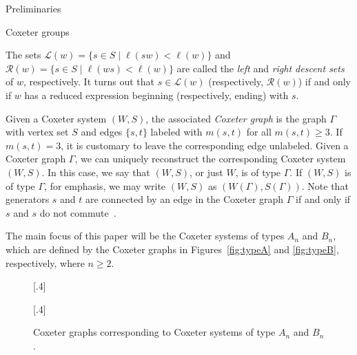 \documentclass[11pt]{amsart}
\theoremstyle{definition}
\numberwithin{equation}{section}
\newcommand{\x}{\mathsf{x}}
\renewcommand{\L}{\mathcal{L}}
\newcommand{\R}{\mathcal{R}}
\renewcommand{\(}{\left(}
\renewcommand{\)}{\right)}
\newcommand{\w}{\mathsf{w}}
\begin{document}
\begin{section}{Preliminaries}
\begin{subsection}{Coxeter groups}

The sets $\L(w)=\{s \in S\mid \ell(sw) < \ell(w)\}$ and $\R(w)=\{s \in S\mid \ell(ws) < \ell(w)\}$ are called the \emph{left} and \emph{right descent sets} of $w$, respectively.  It turns out that $s \in \L(w)$ (respectively, $\R(w)$) if and only if $w$ has a reduced expression beginning (respectively, ending) with $s$.

Given a Coxeter system $(W,S)$, the associated \emph{Coxeter graph} is the graph $\Gamma$ with vertex set $S$ and edges $\{s,t\}$ labeled with $m(s,t)$ for all $m(s,t)\geq 3$.  If $m(s,t)=3$, it is customary to leave the corresponding edge unlabeled.  Given a Coxeter graph $\Gamma$, we can uniquely reconstruct the corresponding Coxeter system $(W,S)$.  In this case, we say that $(W,S)$, or just $W$, is of type $\Gamma$. If $(W,S)$ is of type $\Gamma$, for emphasis, we may write $(W,S)$ as $(W(\Gamma),S(\Gamma))$.  Note that generators $s$ and $t$ are connected by an edge in the Coxeter graph $\Gamma$ if and only if $s$ and $s$ do not commute~\cite{Humphreys1990}.

The main focus of this paper will be the Coxeter systems of types $A_n$ and $B_n$, which are defined by the Coxeter graphs in Figures~\ref{fig:typeA} and \ref{fig:typeB}, respectively, where $n\geq 2$.

\begin{figure}[!ht]
[.4\textwidth]{
}
[.4\textwidth]{
}
\caption{Coxeter graphs corresponding to Coxeter systems of type $A_{n}$ and $B_n$.}\label{fig:CoxeterGraphs}
\end{figure}


\end{subsection}
\end{section}
\end{document}
